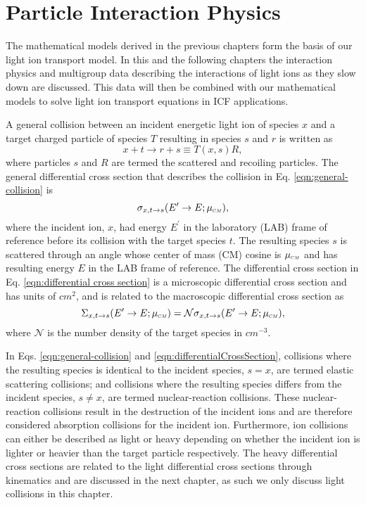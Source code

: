 \documentclass[../main.tex]{subfiles}
\begin{document}
\chapter{Particle Interaction Physics}
The mathematical models derived in the previous chapters form the basis of our light ion transport model. In this and the following chapters the interaction physics and multigroup data describing the interactions of light ions as they slow down are discussed. This data will then be combined with our mathematical models to solve light ion transport equations in ICF applications.

A general collision between an incident energetic light ion of species $x$ and a target charged particle of species $T$ resulting in species $s$ and $r$ is written as
\begin{equation} \label{eqn:general-collision}
    x+t \rightarrow r+s \equiv T(x,s)R,
\end{equation}
where particles $s$ and $R$ are termed the scattered and recoiling particles. The general differential cross section that describes the collision in Eq. \eqref{eqn:general-collision} is
\begin{equation} \label{eqn:differentialCrossSection}
    \sigma_{x,t \rightarrow s}(E^{\prime} \rightarrow E; \mucm),
\end{equation}
where the incident ion, $x$, had energy $E^{\prime}$ in the laboratory (LAB) frame of reference before its collision with the target species $t$. The resulting species $s$ is scattered through an angle whose center of mass (CM) cosine is $\mucm$ and has resulting energy $E$ in the LAB frame of reference. The differential cross section in Eq. \eqref{eqn:differential cross section} is a microscopic differential cross section and has units of $cm^{2}$, and is related to the macroscopic differential cross section as
\begin{equation}
    \Sigma_{x,t \rightarrow s}(E^{\prime} \rightarrow E; \mucm) = \mathcal{N} \sigma_{x,t \rightarrow s}(E^{\prime} \rightarrow E; \mucm),
\end{equation}
where $\mathcal{N}$ is the number density of the target species in $cm^{-3}$.

In Eqs. \eqref{eqn:general-collision} and \eqref{eqn:differentialCrossSection}, collisions where the resulting species is identical to the incident species, $s = x$, are termed elastic scattering collisions; and collisions where the resulting species differs from the incident species, $s \neq x$, are termed nuclear-reaction collisions. These nuclear-reaction collisions result in the destruction of the incident ions and are therefore considered absorption collisions for the incident ion. Furthermore, ion collisions can either be described as light or heavy depending on whether the incident ion is lighter or heavier than the target particle respectively. The heavy differential cross sections are related to the light differential cross sections through kinematics and are discussed in the next chapter, as such we only discuss light collisions in this chapter.
\end{document}
